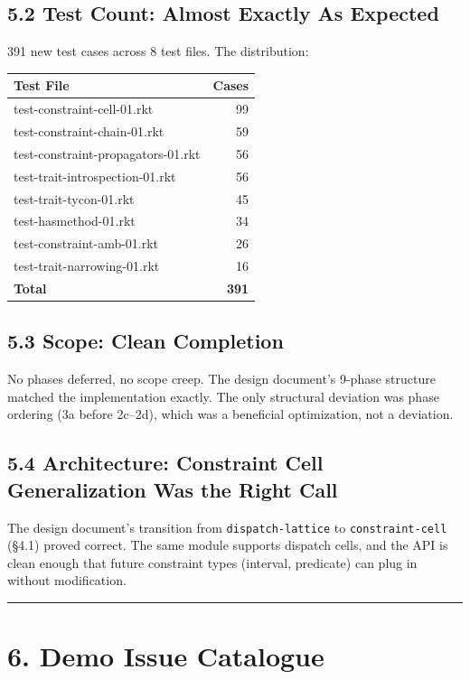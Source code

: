 \documentclass[11pt]{article}
\begin{document}
\subsection{5.2 Test Count: Almost Exactly As Expected}
\label{sec:org013651d}

391 new test cases across 8 test files. The distribution:

\begin{center}
\begin{tabular}{lr}
Test File & Cases\\
\hline
test-constraint-cell-01.rkt & 99\\
test-constraint-chain-01.rkt & 59\\
test-constraint-propagators-01.rkt & 56\\
test-trait-introspection-01.rkt & 56\\
test-trait-tycon-01.rkt & 45\\
test-hasmethod-01.rkt & 34\\
test-constraint-amb-01.rkt & 26\\
test-trait-narrowing-01.rkt & 16\\
\hline
\textbf{Total} & \textbf{391}\\
\end{tabular}
\end{center}
\subsection{5.3 Scope: Clean Completion}
\label{sec:org040a16d}

No phases deferred, no scope creep. The design document's 9-phase structure matched
the implementation exactly. The only structural deviation was phase ordering (3a
before 2c–2d), which was a beneficial optimization, not a deviation.
\subsection{5.4 Architecture: Constraint Cell Generalization Was the Right Call}
\label{sec:org2224f08}

The design document's transition from \texttt{dispatch-lattice} to \texttt{constraint-cell} (§4.1)
proved correct. The same module supports dispatch cells, and the API is clean enough
that future constraint types (interval, predicate) can plug in without modification.

\noindent\rule{\textwidth}{0.5pt}
\section{6. Demo Issue Catalogue}
\label{sec:orgac72452}
\end{document}
